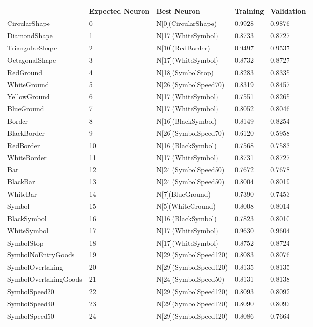 \begin{tabular}{lllll}
\toprule
 & Expected Neuron & Best Neuron & Training & Validation \\
\midrule
CircularShape & 0 & N[0](CircularShape) & 0.9928 & 0.9876 \\
DiamondShape & 1 & N[17](WhiteSymbol) & 0.8733 & 0.8727 \\
TriangularShape & 2 & N[10](RedBorder) & 0.9497 & 0.9537 \\
OctagonalShape & 3 & N[17](WhiteSymbol) & 0.8732 & 0.8727 \\
RedGround & 4 & N[18](SymbolStop) & 0.8283 & 0.8335 \\
WhiteGround & 5 & N[26](SymbolSpeed70) & 0.8319 & 0.8457 \\
YellowGround & 6 & N[17](WhiteSymbol) & 0.7551 & 0.8265 \\
BlueGround & 7 & N[17](WhiteSymbol) & 0.8052 & 0.8046 \\
Border & 8 & N[16](BlackSymbol) & 0.8149 & 0.8254 \\
BlackBorder & 9 & N[26](SymbolSpeed70) & 0.6120 & 0.5958 \\
RedBorder & 10 & N[16](BlackSymbol) & 0.7568 & 0.7583 \\
WhiteBorder & 11 & N[17](WhiteSymbol) & 0.8731 & 0.8727 \\
Bar & 12 & N[24](SymbolSpeed50) & 0.7672 & 0.7678 \\
BlackBar & 13 & N[24](SymbolSpeed50) & 0.8004 & 0.8019 \\
WhiteBar & 14 & N[7](BlueGround) & 0.7390 & 0.7453 \\
Symbol & 15 & N[5](WhiteGround) & 0.8008 & 0.8014 \\
BlackSymbol & 16 & N[16](BlackSymbol) & 0.7823 & 0.8010 \\
WhiteSymbol & 17 & N[17](WhiteSymbol) & 0.9630 & 0.9604 \\
SymbolStop & 18 & N[17](WhiteSymbol) & 0.8752 & 0.8724 \\
SymbolNoEntryGoods & 19 & N[29](SymbolSpeed120) & 0.8083 & 0.8076 \\
SymbolOvertaking & 20 & N[29](SymbolSpeed120) & 0.8135 & 0.8135 \\
SymbolOvertakingGoods & 21 & N[24](SymbolSpeed50) & 0.8131 & 0.8138 \\
SymbolSpeed20 & 22 & N[29](SymbolSpeed120) & 0.8093 & 0.8092 \\
SymbolSpeed30 & 23 & N[29](SymbolSpeed120) & 0.8090 & 0.8092 \\
SymbolSpeed50 & 24 & N[29](SymbolSpeed120) & 0.8086 & 0.7664 \\

\end{tabular}
